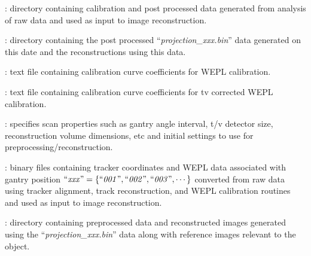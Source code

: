 \documentclass[landscape,12pt]{article}
\begin{document}
\begin{myEnumerate}[labelindent=1pt, leftmargin=*]
\begin{myEnumerate}[labelindent=1pt, leftmargin=*]
\begin{myEnumerate}[labelindent=1pt, leftmargin=*]
\begin{myEnumerate}[labelindent=1pt, leftmargin=*]
\begin{myEnumerate}[labelindent=1pt, leftmargin=*]
\begin{myEnumerate}[labelindent=1pt, leftmargin=*]
                        \end{myEnumerate}
                        \item {} \color{Black}: directory containing calibration and post processed data generated from analysis of raw data and used as input to image reconstruction.
                        \begin{myEnumerate}[labelindent=1pt, leftmargin=*]
                            \item {} \color{Black}: directory containing the post processed ``\textit{projection\_xxx.bin}'' data generated on this date and the reconstructions using this data.
                            \begin{myEnumerate}[labelindent=1pt, leftmargin=*]
                                \item {} \color{Black}: text file containing calibration curve coefficients for WEPL calibration.
                                \item {} \color{Black}: text file containing calibration curve coefficients for tv corrected WEPL calibration.
                                \item {} \color{Black}: specifies scan properties such as gantry angle interval, t/v detector size, reconstruction volume dimensions, etc and initial settings to use for preprocessing/reconstruction.
                                \item {} \color{Black}: binary files containing tracker coordinates and WEPL data associated with gantry position $\textrm{``\textit{xxx}''} =\{\textrm{``\textit{001}''}, \textrm{``\textit{002}''}, \textrm{``\textit{003}''}, \cdots\}$ converted from raw data using tracker alignment, track reconstruction, and WEPL calibration routines and used as input to image reconstruction.
                                \item {} \color{Black}: directory containing preprocessed data and reconstructed images generated using the ``\textit{projection\_xxx.bin}'' data along with reference images relevant to the object.
                                \begin{myEnumerate}[labelindent=1pt, leftmargin=*]

\end{myEnumerate}
\end{myEnumerate}
\end{myEnumerate}
\end{myEnumerate}
\end{myEnumerate}
\end{myEnumerate}
\end{myEnumerate}
\end{myEnumerate}
\end{document}
